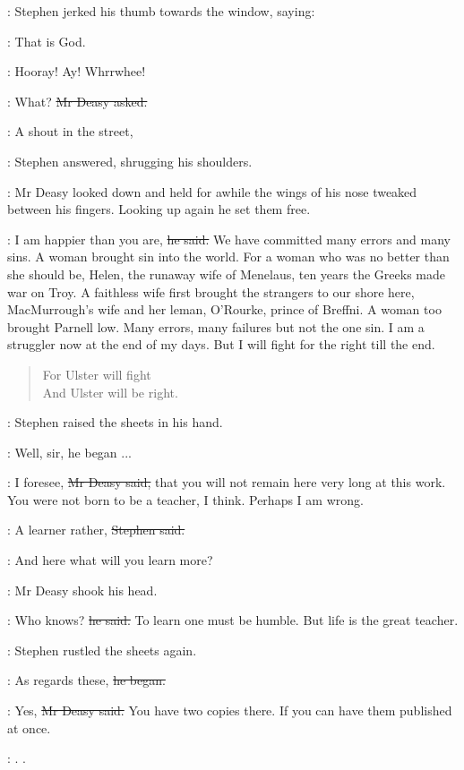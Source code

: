 :
Stephen jerked his thumb towards the window, saying:

\Stephen:
That is God.

\All:
Hooray! Ay! Whrrwhee!

\deasy:
What?
\sout{Mr Deasy asked.}

\Stephen:
A shout in the street,

:
Stephen answered, shrugging his shoulders.

:
Mr Deasy looked down
and held for awhile the wings of his nose
tweaked between his fingers.
Looking up again he set them free.

\deasy:
I am happier than you are, \sout{he said.}
We have committed many errors and many sins.
A woman brought sin into the world.
For a woman who was no better than she should be,
Helen, the runaway wife of Menelaus,
ten years the Greeks made war on Troy.
A faithless wife first brought the strangers to our shore here,
MacMurrough's wife and her leman, O'Rourke, prince of Breffni.
A woman too brought Parnell low.
Many errors, many failures but not the one sin.
I am a struggler now at the end of my days.
But I will fight for the right till the end.

\begin{verse}
    For Ulster will fight \\
    And Ulster will be right.
\end{verse}

:
Stephen raised the sheets in his hand.

\Stephen:
Well, sir, he began ...

\deasy:
I foresee, \sout{Mr Deasy said,}
that you will not remain here very long at this work.
You were not born to be a teacher, I think.
Perhaps I am wrong.

\Stephen:
A learner rather, \sout{Stephen said.}

\StephenInt:
And here what will you learn more?

:
Mr Deasy shook his head.

\deasy:
Who knows? \sout{he said.}
To learn one must be humble.
But life is the great teacher.

:
Stephen rustled the sheets again.

\Stephen:
As regards these, \sout{he began.}

\deasy:
Yes, \sout{Mr Deasy said.}
You have two copies there.
If you can have them published at once.

\StephenInt:
.
.

